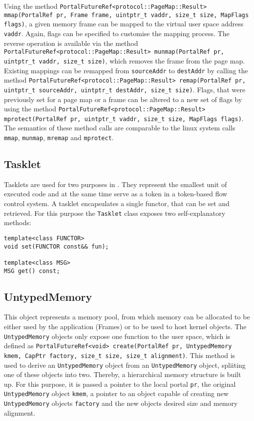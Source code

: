 Using the method \texttt{PortalFutureRef<protocol::PageMap::Result> \\
mmap(PortalRef pr, Frame frame, uintptr\_t vaddr, size\_t size, MapFlags flags)},
a given memory frame can be mapped to the virtual user space address
\texttt{vaddr}. Again, flags can be specified to customise the mapping process.
The reverse operation is available via the method
\texttt{PortalFutureRef<protocol::PageMap::Result> munmap(PortalRef pr,
uintptr\_t vaddr, size\_t size)}, which removes the frame from the page map.
Existing mappings can be remapped from \texttt{sourceAddr} to \texttt{destAddr}
by calling the method \texttt{PortalFutureRef<protocol::PageMap::Result>
remap(PortalRef pr, uintptr\_t sourceAddr, uintptr\_t destAddr, size\_t size)}.
Flags, that were previously set for a page map or a frame can be altered to a
new set of flags by using the method
\texttt{PortalFutureRef<protocol::PageMap::Result> mprotect(PortalRef pr,
uintptr\_t vaddr, size\_t size, MapFlags flags)}.
The semantics of these method calls are comparable to the linux system calls
\texttt{mmap}, \texttt{munmap}, \texttt{mremap} and \texttt{mprotect}.


\subsection{Tasklet}
Tasklets are used for two purposes in \mythos. They represent the smallest unit
of executed code and at the same time serve as a token in a token-based flow
control system. A tasklet encapsulates a single functor, that can be set and
retrieved. For this purpose the \texttt{Tasklet} class exposes two
self-explanatory methods:

\lstset{language=c++}
\begin{lstlisting}
template<class FUNCTOR>
void set(FUNCTOR const&& fun);

template<class MSG>
MSG get() const;
\end{lstlisting}

\subsection{UntypedMemory}
This object represents a memory pool, from which memory can be allocated to be
either used by the application (Frames) or to be used to host kernel objects.
The \texttt{UntypedMemory} objects only expose one function to the user space,
which is defined as \texttt{PortalFutureRef<void> create(PortalRef pr,
UntypedMemory kmem, CapPtr factory, size\_t size, size\_t alignment)}. This
method is used to derive an \texttt{UntypedMemory} object from an
\texttt{UntypedMemory} object, spliiting one of these objects into two. Thereby,
a hierarchical memory structure is built up. For this purpose, it is passed a
pointer to the local portal \texttt{pr}, the original \texttt{UntypedMemory}
object \texttt{kmem}, a pointer to an object capable of creating new
\texttt{UntypedMemory} objects \texttt{factory} and the new objects desired size
and memory alignment.

